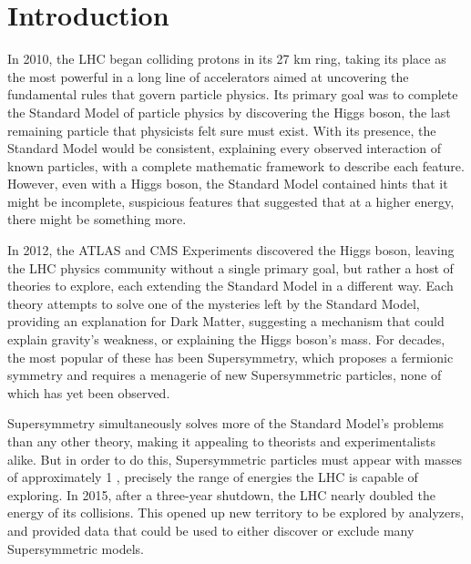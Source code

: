
\chapter{Introduction} %

\label{ch:introduction} %


In 2010, the \acf{LHC} began colliding protons in its 27 km ring, taking its place as the most powerful in a long line of accelerators aimed at uncovering the fundamental rules that govern particle physics. Its primary goal was to complete the Standard Model of particle physics by discovering the Higgs boson, the last remaining particle that physicists felt sure must exist. With its presence, the Standard Model would be consistent, explaining every observed interaction of known particles, with a complete mathematic framework to describe each feature. However, even with a Higgs boson, the Standard Model contained hints that it might be incomplete, suspicious features that suggested that at a higher energy, there might be something more.

In 2012, the \acf{ATLAS} and \acf{CMS} Experiments discovered the Higgs boson, leaving the \ac{LHC} physics community without a single primary goal, but rather a host of theories to explore, each extending the Standard Model in a different way. Each theory attempts to solve one of the mysteries left by the Standard Model, providing an explanation for Dark Matter, suggesting a mechanism that could explain gravity's weakness, or explaining the Higgs boson's mass. For decades, the most popular of these has been Supersymmetry, which proposes a fermionic symmetry and requires a menagerie of new Supersymmetric particles, none of which has yet been observed. 

Supersymmetry simultaneously solves more of the Standard Mo\-del's problems than any other theory, making it appealing to theorists and experimentalists alike. But in order to do this, Supersymmetric particles must appear with masses of approximately 1 \tev, precisely the range of energies the \ac{LHC} is capable of exploring. In 2015, after a three-year shutdown, the \ac{LHC} nearly doubled the energy of its collisions. This opened up new territory to be explored by analyzers, and provided data that could be used to either discover or exclude many Supersymmetric models.

